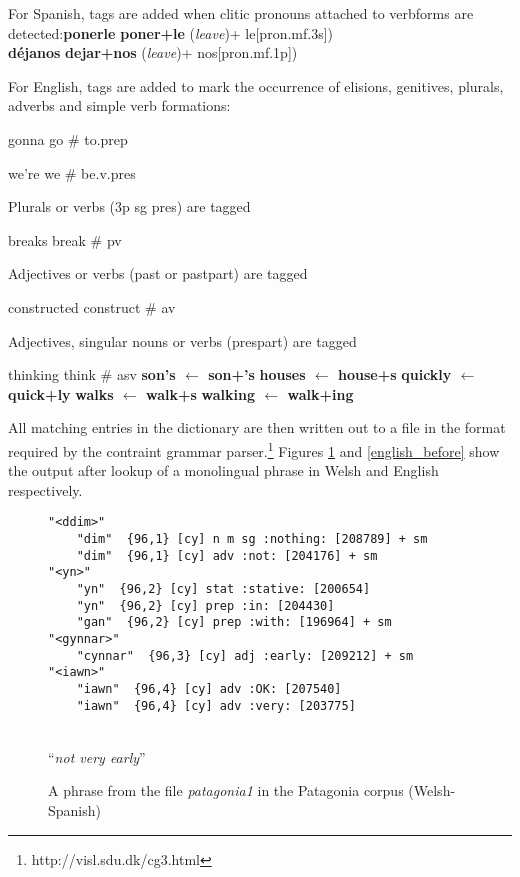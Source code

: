 \documentclass[11pt]{article}
\begin{document}
For Spanish, tags are added when clitic pronouns attached to verbforms are detected:\textbf{ponerle} \textrightarrow \textbf{poner+le} (\textit{leave})+ le[pron.mf.3s]) \\
\textbf{déjanos} \textrightarrow \textbf{dejar+nos} (\textit{leave})+ nos[pron.mf.1p])

For English, tags are added to mark the occurrence of elisions, genitives, plurals, adverbs and simple verb formations:
\item gonna \textrightarrow go \# to.prep
\item we're \textrightarrow we \# be.v.pres
\item Plurals or verbs (3p sg pres) are tagged
\item breaks \textrightarrow break \# pv
\item Adjectives or verbs (past or pastpart) are tagged
\item constructed \textrightarrow construct \# av
\item Adjectives, singular nouns or verbs (prespart) are tagged
\item thinking \textrightarrow think \# asv
\textbf{son's $\leftarrow$ son+'s}
\textbf{houses $\leftarrow$ house+s}
\textbf{quickly $\leftarrow$ quick+ly}
\textbf{walks $\leftarrow$ walk+s}
\textbf{walking $\leftarrow$ walk+ing}

All matching entries in the dictionary are then written out to a file in the format required by the contraint grammar parser.\footnote{http://visl.sdu.dk/cg3.html}  Figures \ref{welsh_before} and \ref{english_before} show the output after lookup of a monolingual phrase in Welsh and English respectively.

\begin{figure}[!hbtp]
\centering
\begin{footnotesize}
\begin{BVerbatim}
"<ddim>"
    "dim"  {96,1} [cy] n m sg :nothing: [208789] + sm
    "dim"  {96,1} [cy] adv :not: [204176] + sm
"<yn>"
    "yn"  {96,2} [cy] stat :stative: [200654]
    "yn"  {96,2} [cy] prep :in: [204430]
    "gan"  {96,2} [cy] prep :with: [196964] + sm
"<gynnar>"
    "cynnar"  {96,3} [cy] adj :early: [209212] + sm
"<iawn>"
    "iawn"  {96,4} [cy] adv :OK: [207540]
    "iawn"  {96,4} [cy] adv :very: [203775]
\end{BVerbatim}
\end{footnotesize}
\\ ``\textit{not very early}''
\caption{A phrase from the file \textit{patagonia1} in the Patagonia corpus (Welsh-Spanish)}
\label{welsh_before}
\end{figure}
\end{document}
